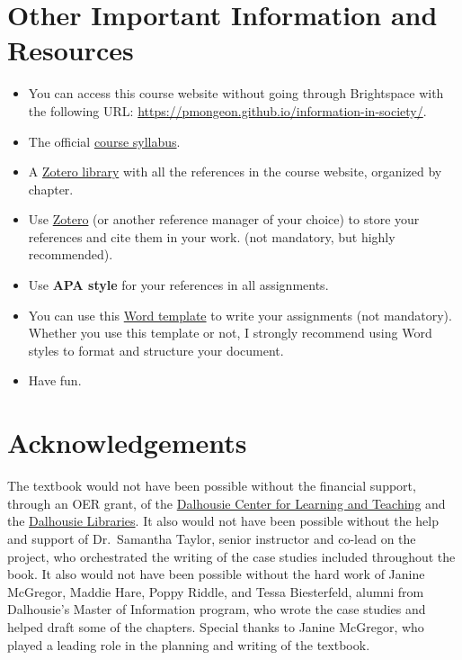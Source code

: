 \documentclass[
  letterpaper,
  DIV=11,
  numbers=noendperiod]{scrreprt}
\providecommand{\tightlist}{%
  \setlength{\itemsep}{0pt}\setlength{\parskip}{0pt}}
\begin{document}

\chapter{Other Important Information and
Resources}\label{other-important-information-and-resources}

\begin{itemize}
\tightlist
\item
  You can access this course website without going through Brightspace
  with the following URL:
  \url{https://pmongeon.github.io/information-in-society/}.
\item
  The official \href{files/INFO5500-Syllabus.pdf}{course syllabus}.
\item
  A
  \href{https://www.zotero.org/groups/2536626/info5500_-_information_in_society/library}{Zotero
  library} with all the references in the course website, organized by
  chapter.
\item
  Use \href{https://www.zotero.org}{Zotero} (or another reference
  manager of your choice) to store your references and cite them in your
  work. (not mandatory, but highly recommended).
\item
  Use \textbf{APA style} for your references in all assignments.
\item
  You can use this \href{files/assignment-template.dotx}{Word template}
  to write your assignments (not mandatory). Whether you use this
  template or not, I strongly recommend using Word styles to format and
  structure your document.
\item
  Have fun.
\end{itemize}


\chapter{Acknowledgements}\label{acknowledgements}

The textbook would not have been possible without the financial support,
through an OER grant, of the
\href{https://www.dal.ca/dept/clt.html}{Dalhousie Center for Learning
and Teaching} and the \href{https://libraries.dal.ca/}{Dalhousie
Libraries}. It also would not have been possible without the help and
support of Dr.~Samantha Taylor, senior instructor and co-lead on the
project, who orchestrated the writing of the case studies included
throughout the book. It also would not have been possible without the
hard work of Janine McGregor, Maddie Hare, Poppy Riddle, and Tessa
Biesterfeld, alumni from Dalhousie's Master of Information program, who
wrote the case studies and helped draft some of the chapters. Special
thanks to Janine McGregor, who played a leading role in the planning and
writing of the textbook.
\end{document}
